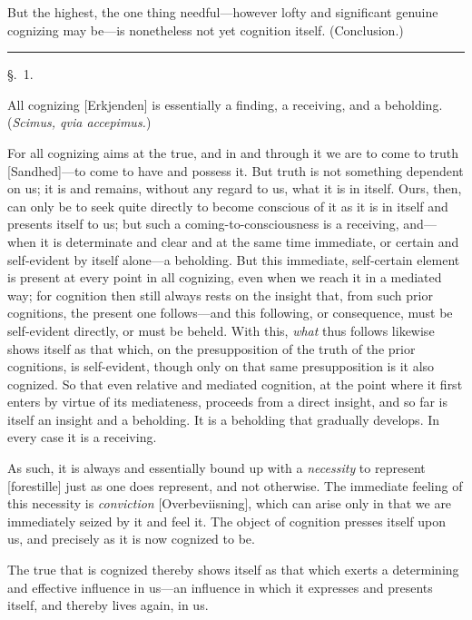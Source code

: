 \documentclass[12pt,a4paper]{book}
\begin{document}
But the highest, the one thing needful---however lofty and significant genuine
cognizing may be---is nonetheless not yet cognition itself. (Conclusion.)

\begin{center}\rule{0.28\linewidth}{0.4pt}\end{center}

\mainmatter


\begin{center}\large\S.~1.\end{center}
All cognizing [Erkjenden] is essentially a finding, a receiving, and a
beholding. (\textit{Scimus, qvia accepimus.})

For all cognizing aims at the true, and in and through it we are to come to
truth [Sandhed]---to come to have and possess it. But truth is not something
dependent on us; it is and remains, without any regard to us, what it is in
itself. Ours, then, can only be to seek quite directly to become conscious of
it as it is in itself and presents itself to us; but such a coming-to-consciousness
is a receiving, and---when it is determinate and clear and at the same time
immediate, or certain and self-evident by itself alone---a beholding. But this
immediate, self-certain element is present at every point in all cognizing,
even when we reach it in a mediated way; for cognition then still always rests
on the insight that, from such prior cognitions, the present one follows---and
this following, or consequence, must be self-evident directly, or must be
beheld. With this, \emph{what} thus follows likewise shows itself as that which, on
the presupposition of the truth of the prior cognitions, is self-evident,
though only on that same presupposition is it also cognized. So that even
relative and mediated cognition, at the point where it first enters by virtue
of its mediateness, proceeds from a direct insight, and so far is itself an
insight and a beholding. It is a beholding that gradually develops. In every
case it is a receiving.

As such, it is always and essentially bound up with a \emph{necessity} to represent
[forestille] just as one does represent, and not otherwise. The immediate
feeling of this necessity is \emph{conviction} [Overbeviisning], which can arise only
in that we are immediately seized by it and feel it. The object of cognition
presses itself upon us, and precisely as it is now cognized to be.

The true that is cognized thereby shows itself as that which exerts a
determining and effective influence in us---an influence in which it expresses
and presents itself, and thereby lives again, in us.
\end{document}
